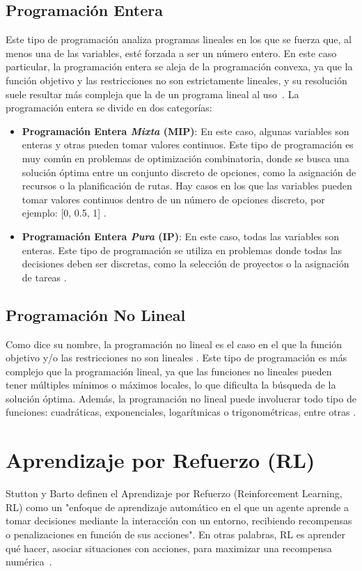 \subsection{Programación Entera}
Este tipo de programación analiza programas lineales en los que se fuerza que, al menos una de las 
variables, esté forzada a ser un número entero. En este caso particular, la programación entera se
aleja de la programación convexa, ya que la función objetivo y las restricciones no son 
estrictamente lineales, y su resolución suele resultar más compleja que la de un programa lineal 
al uso~\cite{wikipedia2025optimizacion}. La programación entera se divide en dos categorías:
\begin{itemize}
    \item \textbf{Programación Entera \textit{Mixta} (MIP)}: En este caso, algunas variables son enteras y
    otras pueden tomar valores continuos. Este tipo de programación es muy común en problemas de
    optimización combinatoria, donde se busca una solución óptima entre un conjunto discreto de
    opciones, como la asignación de recursos o la planificación de rutas. Hay casos en los que las
    variables pueden tomar valores continuos dentro de un número de opciones discreto, por ejemplo: 
    [0, 0.5, 1] \cite{funke2024discreteopt}.
    \item \textbf{Programación Entera \textit{Pura} (IP)}: En este caso, todas las variables son enteras.
    Este tipo de programación se utiliza en problemas donde todas las decisiones deben ser discretas,
    como la selección de proyectos o la asignación de tareas \cite{funke2024discreteopt}.
\end{itemize}

\subsection{Programación No Lineal}
Como dice su nombre, la programación no lineal es el caso en el que la función objetivo y/o las
restricciones no son lineales \cite{wikipedia2025optimizacion}. Este tipo de programación es más
complejo que la programación lineal, ya que las funciones no lineales pueden tener múltiples
mínimos o máximos locales, lo que dificulta la búsqueda de la solución óptima. Además, la
programación no lineal puede involucrar todo tipo de funciones: cuadráticas, exponenciales, 
logarítmicas o trigonométricas, entre otras \cite{funke2024discreteopt}.

\section{Aprendizaje por Refuerzo (RL)}
Stutton y Barto definen el Aprendizaje por Refuerzo (Reinforcement Learning, RL) como un
"enfoque de aprendizaje automático en el que un agente aprende a tomar decisiones mediante la
interacción con un entorno, recibiendo recompensas o penalizaciones en función de sus acciones".
En otras palabras, RL es aprender qué hacer, asociar situaciones con acciones, para maximizar una
recompensa numérica~\cite{sutton2018reinforcement}.\\

